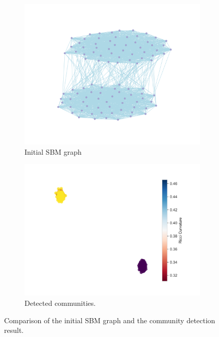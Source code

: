 \begin{figure}[h]
    \centering
    \begin{subfigure}[b]{0.45\textwidth}
        \centering
        \includegraphics[width=\textwidth]{Graphics/ToyModelResults/SBM_results/BeforeRicciFlow.png}
        \caption{Initial SBM graph}
        \label{fig:sbm_initial}
    \end{subfigure}
    \hfill
    \begin{subfigure}[b]{0.45\textwidth}
        \centering
        \includegraphics[width=\textwidth]{Graphics/ToyModelResults/SBM_results/Communities.png}
        \caption{Detected communities.}
        \label{fig:sbm_result}
    \end{subfigure}
    \caption{Comparison of the initial SBM graph and the community detection result.}
    \label{fig2}
\end{figure}


